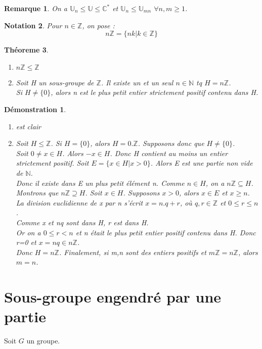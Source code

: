 \documentclass[a4paper, oneside]{report}
\theoremstyle{break}
\newtheorem{thm}{Théoreme}[section] %
\newtheorem{nota}[thm]{Notation}
\newtheorem*{demo}{Démonstration}
\newtheorem{remar}[thm]{Remarque}
\newcommand{\N}{\mathbb{N}}
\newcommand{\C}{\mathbb{C}}
\newcommand{\Z}{\mathbb{Z}}
\newcommand{\U}{\mathbb{U}}
\begin{document}
\begin{remar}
	On a $\U_n \leq \U \leq \C^*$ et $\U_n \leq \U_{mn}$ $\forall n,m\geq 1$.\\
\end{remar}

\begin{nota}
	Pour $n\in \Z$, on pose :
	$$n\Z = \{nk| k\in \Z \}$$
\end{nota}

\begin{thm}
	\begin{enumerate}
		\item $n\Z \leq \Z$
		\item Soit H un sous-groupe de $\Z$. Il existe un et un seul $n\in \N$ tq $H=n\Z$.\\
		Si $H\neq \{0\}$, alors n est le plus petit entier strictement positif contenu dans H.
	\end{enumerate}
\end{thm}

\begin{demo}
	\begin{enumerate}
		\item est clair
		\item Soit $H \leq \Z$. Si $H=\{0\}$, alors $H=0.\Z$. Supposons donc que $H\neq \{0\}$.\\
		Soit $0\neq x\in H$. Alors $-x\in H$. Donc H contient au moins un entier strictement positif. Soit $E=\{x\in H | x>0 \}$. Alors E est une partie non vide de $\N$.\\
		Donc il existe dans E un plus petit élément n. Comme $n\in H$, on a $n\Z \subseteq H$.\\
		Montrons que $n\Z \supseteq H$. Soit $x\in H$. Supposons $x>0$, alors $x\in E$ et $x\geq n$.\\
		La division euclidienne de x par n s'écrit $x=n.q+r$, où $q,r\in \Z$ et $0\leq r\leq n$.\\
		Comme x et nq sont dans H, r est dans H.\\
		Or on a $0\leq r<n$ et n était le plus petit entier positif contenu dans H. Donc r=0 et $x=nq \in n\Z$.\\
		Donc $H=n\Z$. Finalement, si m,n sont des entiers positifs et $m\Z=n\Z$, alors $m=n$.
	\end{enumerate}
\end{demo}

\section{Sous-groupe engendré par une partie}
Soit $G$ un groupe.
\end{document}
